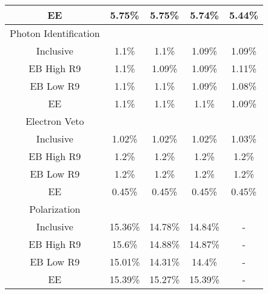 \begin{tabular}{c|c|c|c|c}
EE & 5.75\% & 5.75\% & 5.74\% & 5.44\% \\
\hline\hline
Photon Identification  & \multicolumn{4}{l}{} \\ \hline
Inclusive & 1.1\% & 1.1\% & 1.09\% & 1.09\% \\
EB High R9 & 1.1\% & 1.09\% & 1.09\% & 1.11\% \\
EB Low R9 & 1.1\% & 1.1\% & 1.09\% & 1.08\% \\
EE & 1.1\% & 1.1\% & 1.1\% & 1.09\% \\
\hline\hline
Electron Veto  & \multicolumn{4}{l}{} \\ \hline
Inclusive & 1.02\% & 1.02\% & 1.02\% & 1.03\% \\
EB High R9 & 1.2\% & 1.2\% & 1.2\% & 1.2\% \\
EB Low R9 & 1.2\% & 1.2\% & 1.2\% & 1.2\% \\
EE & 0.45\% & 0.45\% & 0.45\% & 0.45\% \\
\hline\hline
Polarization  & \multicolumn{4}{l}{} \\ \hline
Inclusive & 15.36\% & 14.78\% & 14.84\% & - \\
EB High R9 & 15.6\% & 14.88\% & 14.87\% & - \\
EB Low R9 & 15.01\% & 14.31\% & 14.4\% & - \\
EE & 15.39\% & 15.27\% & 15.39\% & - \\
\hline\hline

\end{tabular}

 
